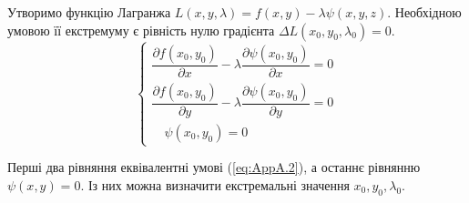 Утворимо функцію Лагранжа $L(x,y,\lambda) = f(x,y) - \lambda \psi(x,y,z)$. Необхідною умовою її екстремуму є рівність нулю градієнта $\Delta L(x_0, y_0, \lambda_0) = 0$.
\begin{equation}
\begin{cases}
\dfrac{\partial f(x_0, y_0)}{\partial x} - \lambda \dfrac{\partial \psi(x_0, y_0)}{\partial x} = 0 \\[2ex]
\dfrac{\partial f(x_0, y_0)}{\partial y} - \lambda \dfrac{\partial \psi(x_0, y_0)}{\partial y} = 0 \\[2ex]
\quad \psi(x_0, y_0) = 0
\end{cases}
\end{equation}

Перші два рівняння еквівалентні умові (\ref{eq:AppA.2}), а останнє рівнянню $\psi(x,y)=0$. Із них можна визначити екстремальні значення $x_0, y_0, \lambda_0$.